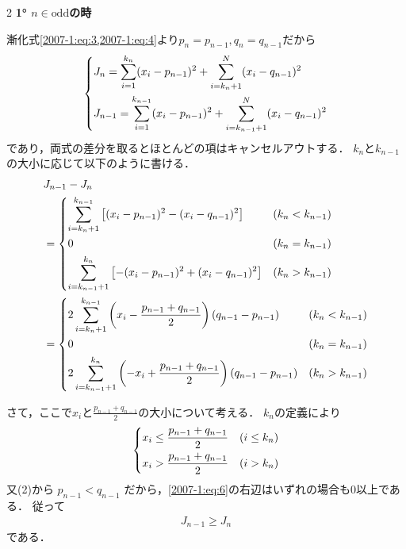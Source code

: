 \documentclass[../../../../main.tex]{subfiles}
\begin{document}
\begin{multicols}{2}
  \vspace{5pt}
  \textbf{1° $n \in \text{odd}$の時}

  漸化式\cref{2007-1:eq:3,2007-1:eq:4}より$p_{n}=p_{n-1}, q_{n}=q_{n-1}$だから
  \begin{align*}
    \begin{dcases}
      J_n      = \sum_{i=1}^{k_n}     (x_i-p_{n-1})^2 + \sum_{i=k_{n}+1}^{N}     (x_i-q_{n-1})^2 \\
      J_{n-1}  = \sum_{i=1}^{k_{n-1}} (x_i-p_{n-1})^2 + \sum_{i=k_{n-1}+1}^{N} (x_i-q_{n-1})^2
    \end{dcases}
  \end{align*}
  であり，両式の差分を取るとほとんどの項はキャンセルアウトする．
  $k_n$と$k_{n-1}$の大小に応じて以下のように書ける．
  \begin{align}
     & J_{n-1} - J_{n}                                                                              \\
     & =
    \begin{dcases}
      \sum_{i=k_{n}+1}^{k_{n-1}} \left[ (x_i-p_{n-1})^2 - (x_i-q_{n-1})^2 \right]  & (k_n < k_{n-1} ) \\
      0                                                                            & (k_n = k_{n-1})  \\
      \sum_{i=k_{n-1}+1}^{k_{n}} \left[ -(x_i-p_{n-1})^2 + (x_i-q_{n-1})^2 \right] & (k_n > k_{n-1})  \\
    \end{dcases} \\
     & =
    \begin{dcases}
      2 \sum_{i=k_{n}+1}^{k_{n-1}} \left( x_i - \frac{p_{n-1}+q_{n-1}}{2} \right) (q_{n-1}-p_{n-1})  & (k_n < k_{n-1}) \\
      0                                                                                              & (k_n = k_{n-1}) \\
      2 \sum_{i=k_{n-1}+1}^{k_{n}} \left( -x_i + \frac{p_{n-1}+q_{n-1}}{2} \right) (q_{n-1}-p_{n-1}) & (k_n > k_{n-1}) \\
    \end{dcases}\label{2007-1:eq:6}
  \end{align}

  さて，ここで$x_i$と$\frac{p_{n-1}+q_{n-1}}{2}$の大小について考える．
  $k_{n}$の定義により
  \begin{align*}
    \begin{dcases}
      x_i \le \frac{p_{n-1}+q_{n-1}}{2} & (i \le k_{n}) \\
      x_i > \frac{p_{n-1}+q_{n-1}}{2}   & (i > k_{n})
    \end{dcases}
  \end{align*}
  又(2)から $p_{n-1}<q_{n-1}$ だから，\cref{2007-1:eq:6}の右辺はいずれの場合も$0$以上である．
  従って
  \begin{align*}
    J_{n-1} \ge J_{n}
  \end{align*}
  である．


\end{multicols}
\end{document}
